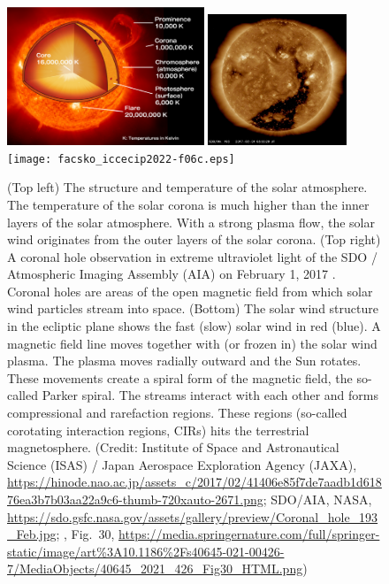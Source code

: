 \documentclass[sn-aps]{sn-jnl}%
\begin{document}
\begin{figure}[t]
\centering
\includegraphics[width=0.525\textwidth]{facsko_iccecip2022-f06a.eps}
\includegraphics[width=0.37\textwidth]{facsko_iccecip2022-f06b.eps}
\texttt{[image: facsko\_iccecip2022-f06c.eps]}
\caption{(Top left) The structure and temperature of the solar atmosphere. The temperature of the solar corona is much higher than the inner layers of the solar atmosphere. With a strong plasma flow, the solar wind originates from the outer layers of the solar corona. (Top right) A coronal hole observation in extreme ultraviolet light of the SDO / Atmospheric Imaging Assembly (AIA) on February 1, 2017 \cite{pesnell12:_solar_dynam_obser_sdo,lemen12:_atmos_imagin_assem_aia_solar}.  Coronal holes are areas of the open magnetic field from which solar wind particles stream into space. (Bottom) The solar wind structure in the ecliptic plane shows the fast (slow) solar wind in red (blue). A magnetic field line moves together with (or frozen in) the solar wind plasma. The plasma moves radially outward and the Sun rotates. These movements create a spiral form of the magnetic field, the so-called Parker spiral. The streams interact with each other and forms compressional and rarefaction regions. These regions (so-called corotating interaction regions, CIRs) hits the terrestrial magnetosphere. (Credit: Institute of Space and Astronautical Science (ISAS) / Japan Aerospace Exploration Agency (JAXA), \url{https://hinode.nao.ac.jp/assets_c/2017/02/41406e85f7de7aadb1d61876ea3b7b03aa22a9c6-thumb-720xauto-2671.png}; SDO/AIA, NASA, \url{https://sdo.gsfc.nasa.gov/assets/gallery/preview/Coronal_hole_193_Feb.jpg}; \cite{zhang21:_earth}, Fig.~30, \url{https://media.springernature.com/full/springer-static/image/art\%3A10.1186\%2Fs40645-021-00426-7/MediaObjects/40645\_2021\_426\_Fig30\_HTML.png})}\label{fig:corona}
\end{figure}
\end{document}
